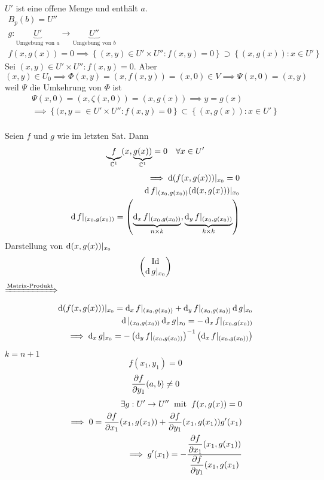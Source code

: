 \begin{Bew}
\begin{eqnarray*}
    \end{eqnarray*}
    $U'$ ist eine offene Menge und enthält $a$.
    \begin{eqnarray*}
      B_p(b)=U''\\
      g:\underbrace{U'}_{\text{Umgebung von $a$}} \to\underbrace{U''}_{\text{Umgebung von $b$}}\\
      f(x,g(x))=0\implies \left\{ (x,y)\in U'\times U'':f(x,y)=0 \right\}\supset \left\{ (x,g(x)): x\in U' \right\}
    \end{eqnarray*}
    Sei $(x,y)\in U'\times U'': f(x,y)=0$. Aber
    \[(x,y)\in U_0\implies \Phi(x,y)=(x,f(x,y))=(x,0)\in V  \implies\Psi(x,0)=(x,y)\]
    weil $\Psi$ die Umkehrung von $\Phi$ ist
    \begin{eqnarray*}
      \Psi(x,0)=(x,\zeta(x,0))=(x,g(x))\implies y=g(x)\\
      \implies \left\{ (x,y=\in U'\times U'':f(x,y)=0 \right\}\subset \left\{ (x,g(x)):x\in U' \right\}\\
    \end{eqnarray*}
\end{Bew}
\begin{Bem}
  Seien $f$ und $g$ wie im letzten Sat. Dann
  \begin{align*}
    \underbrace{f}_{\mathbb{C}^1}(x,\underbrace{g(x))}_{\mathbb{C}^1}=0&&\forall x\in U'
  \end{align*}
  \begin{eqnarray*}
    \implies \operatorname{d} (f(x,g(x)))|_{x_0}=0\\
    \operatorname{d} f|_{(x_0,g(x_0))}(\operatorname{d}(x,g(x)))|_{x_0}\\
    \operatorname{d} f|_{(x_0,g(x_0))}=\left( \underbrace{\operatorname{d}_x f|_{(x_0,g(x_0))}}_{n\times k}, \underbrace{\operatorname{d}_y f|_{(x_0,g(x_0))}}_{k\times k} \right)
  \end{eqnarray*}
  Darstellung von $\operatorname{d}(x,g(x))|_{x_0}$
  \[ \begin{pmatrix}
    \operatorname{Id} \\ \operatorname{d} g|_{x_0}
  \end{pmatrix} \]
  $\xRightarrow{\text{Matrix-Produkt}}$
  \begin{eqnarray*}
    \operatorname{d} (f(x,g(x)))|_{x_0}=\operatorname{d}_x f|_{(x_0,g(x_0))} + \operatorname{d}_y f|_{(x_0,g(x_0))} \operatorname{d} g|_{x_0}\\
    \operatorname{d}|_{(x_0,g(x_0))}\operatorname{d}_xg|_{x_0}=-\operatorname{d}_x f|_{(x_0,g(x_0))}\\
    \implies \operatorname{d}_x g|_{x_0}= - \left( \operatorname{d}_yf|_{(x_0,g(x_0))} \right)^{-1}\left( \operatorname{d}_xf|_{(x_0,g(x_0))} \right)
  \end{eqnarray*}
\end{Bem}
\begin{Bsp}
  $k=n+1$
  \[f(x_1,y_1)=0\]
  \[\dfrac{\partial f}{\partial y_1}(a,b)\neq 0\]
  \begin{eqnarray*}
    \exists g:U'\rightarrow U''\hspace{2mm}\text{mit}\hspace{2mm} f(x,g(x))=0\\
    \implies 0=\dfrac{\partial f}{\partial x_1}(x_1,g(x_1))+\dfrac{\partial f}{\partial y_1}(x_1,g(x_1))g'(x_1)\\
    \implies g'(x_1)= - \frac{\dfrac{\partial f}{\partial x_1}(x_1,g(x_1))}{\dfrac{\partial f}{\partial y_1}(x_1,g(x_1)}
  \end{eqnarray*}
\end{Bsp}
